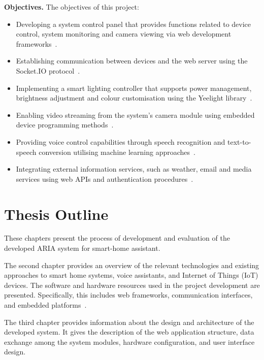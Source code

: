 \vspace{0.5em}
\textbf{Objectives.} The objectives of this project:

\begin{itemize}
    \item Developing a system control panel that provides functions related to device control, system monitoring and camera viewing via web development frameworks~\cite{flask}.
    \item Establishing communication between devices and the web server using the Socket.IO protocol~\cite{flask-socketio,socketio}.
    \item Implementing a smart lighting controller that supports power management, brightness adjustment and colour customisation using the Yeelight library~\cite{yeelight}.
    \item Enabling video streaming from the system's camera module using embedded device programming methods~\cite{esp-idf}.
    \item Providing voice control capabilities through speech recognition and text-to-speech conversion utilising machine learning approaches~\cite{whisper,faster-whisper,edge-tts}.
    \item Integrating external information services, such as weather, email and media services using web APIs and authentication procedures~\cite{openweather,gmail-api,youtube-api,google-oauth}.
\end{itemize}

\section{Thesis Outline}

These chapters present the process of development and evaluation of the developed ARIA system for smart-home assistant.

The second chapter provides an overview of the relevant technologies and existing approaches to smart home systems, voice assistants, and Internet of Things (IoT) devices. The software and hardware resources used in the project development are presented. Specifically, this includes web frameworks, communication interfaces, and embedded platforms~\cite{flask,flask-socketio,esp-idf}.

The third chapter provides information about the design and architecture of the developed system. It gives the description of the web application structure, data exchange among the system modules, hardware configuration, and user interface design.

